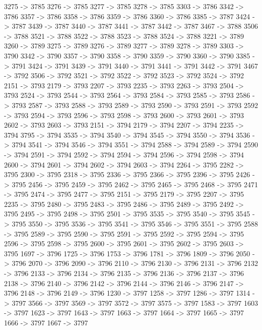 {	3275 -> 3785
	3276 -> 3785
	3277 -> 3785
	3278 -> 3785
	3303 -> 3786
	3342 -> 3786
	3357 -> 3786
	3358 -> 3786
	3359 -> 3786
	3360 -> 3786
	3385 -> 3787
	3424 -> 3787
	3439 -> 3787
	3440 -> 3787
	3441 -> 3787
	3442 -> 3787
	3467 -> 3788
	3506 -> 3788
	3521 -> 3788
	3522 -> 3788
	3523 -> 3788
	3524 -> 3788
	3221 -> 3789
	3260 -> 3789
	3275 -> 3789
	3276 -> 3789
	3277 -> 3789
	3278 -> 3789
	3303 -> 3790
	3342 -> 3790
	3357 -> 3790
	3358 -> 3790
	3359 -> 3790
	3360 -> 3790
	3385 -> 3791
	3424 -> 3791
	3439 -> 3791
	3440 -> 3791
	3441 -> 3791
	3442 -> 3791
	3467 -> 3792
	3506 -> 3792
	3521 -> 3792
	3522 -> 3792
	3523 -> 3792
	3524 -> 3792
	2151 -> 3793
	2179 -> 3793
	2207 -> 3793
	2235 -> 3793
	2263 -> 3793
	2504 -> 3793
	2524 -> 3793
	2544 -> 3793
	2564 -> 3793
	2584 -> 3793
	2585 -> 3793
	2586 -> 3793
	2587 -> 3793
	2588 -> 3793
	2589 -> 3793
	2590 -> 3793
	2591 -> 3793
	2592 -> 3793
	2594 -> 3793
	2596 -> 3793
	2598 -> 3793
	2600 -> 3793
	2601 -> 3793
	2602 -> 3793
	2603 -> 3793
	2151 -> 3794
	2179 -> 3794
	2207 -> 3794
	2235 -> 3794
	3795 -> 3794
	3535 -> 3794
	3540 -> 3794
	3545 -> 3794
	3550 -> 3794
	3536 -> 3794
	3541 -> 3794
	3546 -> 3794
	3551 -> 3794
	2588 -> 3794
	2589 -> 3794
	2590 -> 3794
	2591 -> 3794
	2592 -> 3794
	2594 -> 3794
	2596 -> 3794
	2598 -> 3794
	2600 -> 3794
	2601 -> 3794
	2602 -> 3794
	2603 -> 3794
	2264 -> 3795
	2282 -> 3795
	2300 -> 3795
	2318 -> 3795
	2336 -> 3795
	2366 -> 3795
	2396 -> 3795
	2426 -> 3795
	2456 -> 3795
	2459 -> 3795
	2462 -> 3795
	2465 -> 3795
	2468 -> 3795
	2471 -> 3795
	2474 -> 3795
	2477 -> 3795
	2151 -> 3795
	2179 -> 3795
	2207 -> 3795
	2235 -> 3795
	2480 -> 3795
	2483 -> 3795
	2486 -> 3795
	2489 -> 3795
	2492 -> 3795
	2495 -> 3795
	2498 -> 3795
	2501 -> 3795
	3535 -> 3795
	3540 -> 3795
	3545 -> 3795
	3550 -> 3795
	3536 -> 3795
	3541 -> 3795
	3546 -> 3795
	3551 -> 3795
	2588 -> 3795
	2589 -> 3795
	2590 -> 3795
	2591 -> 3795
	2592 -> 3795
	2594 -> 3795
	2596 -> 3795
	2598 -> 3795
	2600 -> 3795
	2601 -> 3795
	2602 -> 3795
	2603 -> 3795
	1697 -> 3796
	1725 -> 3796
	1753 -> 3796
	1781 -> 3796
	1809 -> 3796
	2050 -> 3796
	2070 -> 3796
	2090 -> 3796
	2110 -> 3796
	2130 -> 3796
	2131 -> 3796
	2132 -> 3796
	2133 -> 3796
	2134 -> 3796
	2135 -> 3796
	2136 -> 3796
	2137 -> 3796
	2138 -> 3796
	2140 -> 3796
	2142 -> 3796
	2144 -> 3796
	2146 -> 3796
	2147 -> 3796
	2148 -> 3796
	2149 -> 3796
	1230 -> 3797
	1258 -> 3797
	1286 -> 3797
	1314 -> 3797
	3566 -> 3797
	3569 -> 3797
	3572 -> 3797
	3575 -> 3797
	1583 -> 3797
	1603 -> 3797
	1623 -> 3797
	1643 -> 3797
	1663 -> 3797
	1664 -> 3797
	1665 -> 3797
	1666 -> 3797
	1667 -> 3797
}
